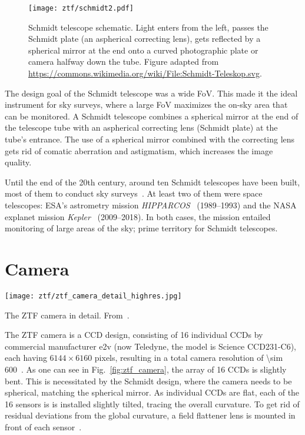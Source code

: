 \begin{figure}[htb]
    \texttt{[image: ztf/schmidt2.pdf]}
    \caption[Schmidt telescope schematic]{Schmidt telescope schematic. Light enters from the left, passes the Schmidt plate (an aspherical correcting lens), gets reflected by a spherical mirror at the end onto a curved photographic plate or camera halfway down the tube. Figure adapted from \url{https://commons.wikimedia.org/wiki/File:Schmidt-Teleskop.svg}.}
\end{figure}

The design goal of the Schmidt telescope was a wide FoV. This made it the ideal instrument for sky surveys, where a large FoV maximizes the on-sky area that can be monitored. A Schmidt telescope combines a spherical mirror at the end of the telescope tube with an aspherical correcting lens (Schmidt plate) at the tube's entrance. The use of a spherical mirror combined with the correcting lens gets rid of comatic aberration and astigmatism, which increases the image quality.

Until the end of the 20th century, around ten Schmidt telescopes have been built, most of them to conduct sky surveys~. At least two of them were space telescopes: ESA's astrometry mission \textit{HIPPARCOS}~ (1989--1993) and the NASA explanet mission \textit{Kepler}~ (2009--2018). In both cases, the mission entailed monitoring of large areas of the sky; prime territory for Schmidt telescopes.

\section{Camera}
\begin{marginfigure}
    \texttt{[image: ztf/ztf\_camera\_detail\_highres.jpg]}
    \caption[ZTF camera cutaway]{The ZTF camera in detail. From~\cite{Dekany2020}.}
\end{marginfigure}
The ZTF camera is a CCD design, consisting of 16 individual CCDs by commercial manufacturer e2v (now Teledyne, the model is Science CCD231-C6), each having $6144\times6160$ pixels, resulting in a total camera resolution of \SI{\sim 600}{\mpix}~. As one can see in Fig.~\ref{fig:ztf_camera}, the array of 16 CCDs is slightly bent. This is necessitated by the Schmidt design, where the camera needs to be spherical, matching the spherical mirror. As individual CCDs are flat, each of the 16 sensors is is installed slightly tilted, tracing the overall curvature. To get rid of residual deviations from the global curvature, a field flattener lens is mounted in front of each sensor~.

